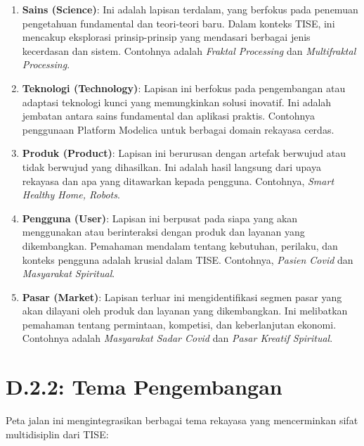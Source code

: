 \documentclass[
  letterpaper,
  DIV=11,
  numbers=noendperiod]{scrreprt}
\providecommand{\tightlist}{%
  \setlength{\itemsep}{0pt}\setlength{\parskip}{0pt}}
\begin{document}
\begin{enumerate}
\def\labelenumi{\arabic{enumi}.}
\tightlist
\item
  \textbf{Sains (Science)}: Ini adalah lapisan terdalam, yang berfokus
  pada penemuan pengetahuan fundamental dan teori-teori baru. Dalam
  konteks TISE, ini mencakup eksplorasi prinsip-prinsip yang mendasari
  berbagai jenis kecerdasan dan sistem. Contohnya adalah \emph{Fraktal
  Processing} dan \emph{Multifraktal Processing}.
\item
  \textbf{Teknologi (Technology)}: Lapisan ini berfokus pada
  pengembangan atau adaptasi teknologi kunci yang memungkinkan solusi
  inovatif. Ini adalah jembatan antara sains fundamental dan aplikasi
  praktis. Contohnya penggunaan Platform Modelica untuk berbagai domain
  rekayasa cerdas.
\item
  \textbf{Produk (Product)}: Lapisan ini berurusan dengan artefak
  berwujud atau tidak berwujud yang dihasilkan. Ini adalah hasil
  langsung dari upaya rekayasa dan apa yang ditawarkan kepada pengguna.
  Contohnya, \emph{Smart Healthy Home, Robots}.
\item
  \textbf{Pengguna (User)}: Lapisan ini berpusat pada siapa yang akan
  menggunakan atau berinteraksi dengan produk dan layanan yang
  dikembangkan. Pemahaman mendalam tentang kebutuhan, perilaku, dan
  konteks pengguna adalah krusial dalam TISE. Contohnya, \emph{Pasien
  Covid} dan \emph{Masyarakat Spiritual}.
\item
  \textbf{Pasar (Market)}: Lapisan terluar ini mengidentifikasi segmen
  pasar yang akan dilayani oleh produk dan layanan yang dikembangkan.
  Ini melibatkan pemahaman tentang permintaan, kompetisi, dan
  keberlanjutan ekonomi. Contohnya adalah \emph{Masyarakat Sadar Covid}
  dan \emph{Pasar Kreatif Spiritual}.
\end{enumerate}

\section{\texorpdfstring{\textbf{D.2.2: Tema
Pengembangan}}{D.2.2: Tema Pengembangan}}\label{d.2.2-tema-pengembangan}

Peta jalan ini mengintegrasikan berbagai tema rekayasa yang mencerminkan
sifat multidisiplin dari TISE:
\end{document}
